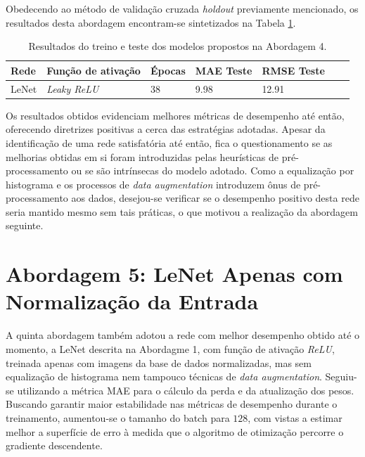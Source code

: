	Obedecendo ao método de validação cruzada \emph{holdout} previamente mencionado, os resultados desta abordagem encontram-se sintetizados na Tabela \ref{tab:results-4}.

	\begin{table}[!ht]
		\centering
		\caption{Resultados do treino e teste dos modelos propostos na Abordagem 4.}
		\label{tab:results-4}
			\begin{tabular}{l l l l l l l}
				\toprule
				Rede & Função de ativação & Épocas & MAE Teste & RMSE Teste \\
				\midrule
				LeNet & \emph{Leaky ReLU} & 38 & 9.98 & 12.91 \\
				\bottomrule
			\end{tabular}
	\end{table}

	Os resultados obtidos evidenciam melhores métricas de desempenho até então, oferecendo diretrizes positivas a cerca das estratégias adotadas. Apesar da identificação de uma rede satisfatória até então, fica o questionamento se as melhorias obtidas em si foram introduzidas pelas heurísticas de pré-processamento ou se são intrínsecas do modelo adotado. Como a equalização por histograma e os processos de \emph{data augmentation} introduzem ônus de pré-processamento aos dados, desejou-se verificar se o desempenho positivo desta rede seria mantido mesmo sem tais práticas, o que motivou a realização da abordagem seguinte.

\section{Abordagem 5: LeNet Apenas com Normalização da Entrada}%
	A quinta abordagem também adotou a rede com melhor desempenho obtido até o momento, a LeNet descrita na Abordagme 1, com função de ativação \emph{ReLU}, treinada apenas com imagens da base de dados normalizadas, mas sem equalização de histograma nem tampouco técnicas de \emph{data augmentation}. Seguiu-se utilizando a métrica MAE para o cálculo da perda e da atualização dos pesos. Buscando garantir maior estabilidade nas métricas de desempenho durante o treinamento, aumentou-se o tamanho do batch para $128$, com vistas a estimar melhor a superfície de erro à medida que o algoritmo de otimização percorre o gradiente descendente.

